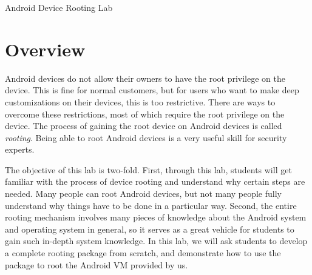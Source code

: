



\newcommand{\rootingFigs}{./Figs}





\begin{center}
{\LARGE Android Device Rooting Lab}
\end{center}




\section{Overview}

Android devices do not allow their owners to have the root privilege on the
device. This is fine for normal customers, but for users who want to make
deep customizations on their devices, this is too restrictive. There are
ways to overcome these restrictions, most of which require the root
privilege on the device. The process of gaining the root device on Android
devices is called \textit{rooting}. Being able to root Android devices is a
very useful skill for security experts. 


The objective of this lab is two-fold. First, through this lab, students
will get familiar with the process of device rooting and understand why
certain steps are needed. Many people can root Android devices, but not
many people fully understand why things have to be done in a particular
way. Second, the entire rooting mechanism involves
many pieces of knowledge about the Android system and operating system in
general, so it serves as a great vehicle for students to gain such in-depth
system knowledge. In this lab, we will ask students to develop a complete rooting
package from scratch, and demonstrate how to use the package to root the
Android VM provided by us. 


